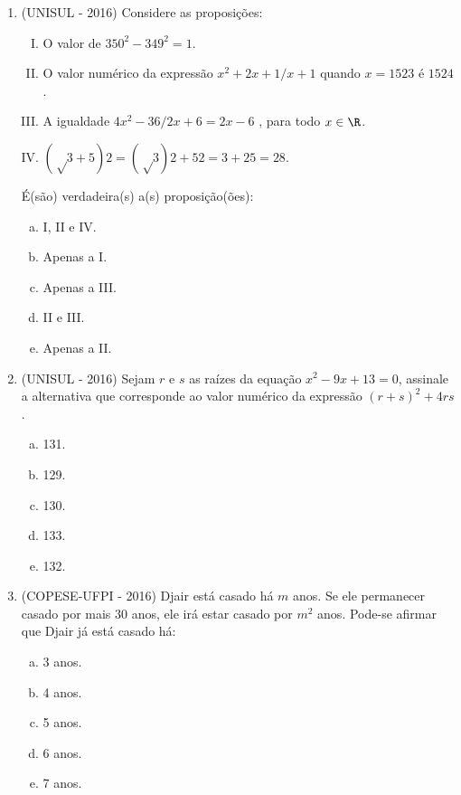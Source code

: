\begin{enumerate}
 \item (UNISUL - 2016) Considere as proposições:
 \begin{enumerate}[I)]
 \item O valor de $350^2 - 349^2 = 1$.
 \item O valor numérico da expressão  $x^2+ 2x + 1 / x+1$ quando $x = 1523$ é $1524$.
 \item A igualdade $4x^2 - 36 / 2x + 6 = 2x - 6$ , para todo $x \in \R$.
 \item $(√3 + 5)2 = (√3)2 + 52 = 3 + 25 =28$.
 \end{enumerate}
 É(são) verdadeira(s) a(s) proposição(ões):
 \begin{enumerate}[a)]
 \item I, II e IV.
 \item Apenas a I.
 \item Apenas a III.
 \item II e III.
 \item Apenas a II.
 \end{enumerate}

 \item (UNISUL - 2016) Sejam $r$ e $s$ as raízes da equação $x^2 - 9x + 13 = 0$, assinale a alternativa que corresponde ao valor numérico da expressão $(r + s)^2 + 4rs$.
 \begin{multicols}{5}
 \begin{enumerate}[a)]
 \item 131.
 \item 129.
 \item 130.
 \item 133.
 \item 132.
 \end{enumerate}
 \end{multicols}

 \item (COPESE-UFPI - 2016) Djair está casado há $m$ anos. Se ele permanecer casado por mais $30$ anos, ele irá estar casado por $m^2$ anos. Pode-se afirmar que Djair já está casado há:
 \begin{multicols}{5}
 \begin{enumerate}[a)]
 \item 3 anos.
 \item 4 anos.
 \item 5 anos.
 \item 6 anos.
 \item 7 anos.
 \end{enumerate}
 \end{multicols}


\end{enumerate}
